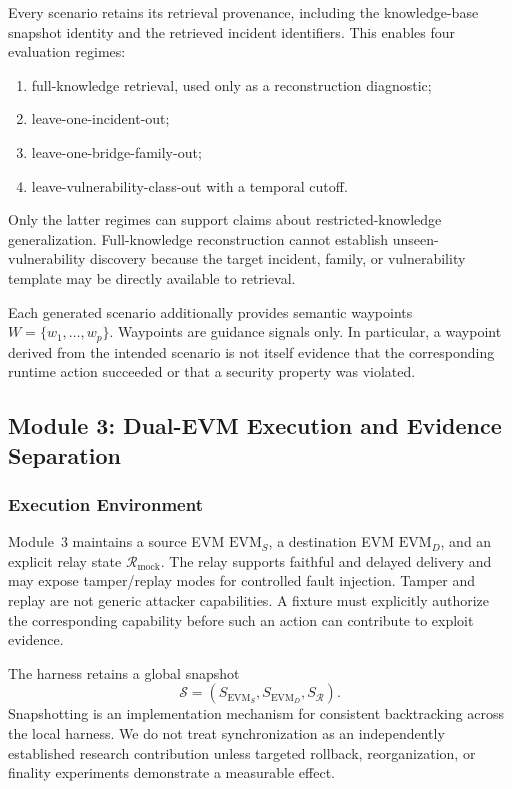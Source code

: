 Every scenario retains its retrieval provenance, including the knowledge-base snapshot identity and the retrieved incident identifiers. This enables four evaluation regimes:
\begin{enumerate}
    \item full-knowledge retrieval, used only as a reconstruction diagnostic;
    \item leave-one-incident-out;
    \item leave-one-bridge-family-out;
    \item leave-vulnerability-class-out with a temporal cutoff.
\end{enumerate}
Only the latter regimes can support claims about restricted-knowledge generalization. Full-knowledge reconstruction cannot establish unseen-vulnerability discovery because the target incident, family, or vulnerability template may be directly available to retrieval.

Each generated scenario additionally provides semantic waypoints $W=\{w_1,\ldots,w_p\}$. Waypoints are guidance signals only. In particular, a waypoint derived from the intended scenario is not itself evidence that the corresponding runtime action succeeded or that a security property was violated.

\subsection{Module 3: Dual-EVM Execution and Evidence Separation}

\subsubsection{Execution Environment}

Module~3 maintains a source EVM $\mathrm{EVM}_S$, a destination EVM $\mathrm{EVM}_D$, and an explicit relay state $\mathcal{R}_{\mathrm{mock}}$. The relay supports faithful and delayed delivery and may expose tamper/replay modes for controlled fault injection. Tamper and replay are not generic attacker capabilities. A fixture must explicitly authorize the corresponding capability before such an action can contribute to exploit evidence.

The harness retains a global snapshot
\begin{equation}
    \mathcal{S}=(S_{\mathrm{EVM}_S},S_{\mathrm{EVM}_D},S_{\mathcal{R}}).
\end{equation}
Snapshotting is an implementation mechanism for consistent backtracking across the local harness. We do not treat synchronization as an independently established research contribution unless targeted rollback, reorganization, or finality experiments demonstrate a measurable effect.

